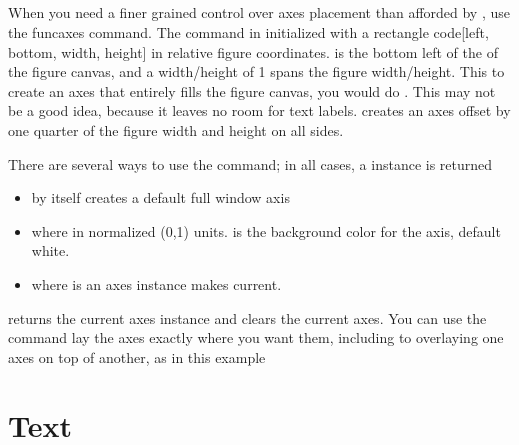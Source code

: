 \documentclass[twoside]{book}
\begin{document}
\subsection{}
\label{sec:axes}

When you need a finer grained control over axes placement than
afforded by , use the func{axes} command.  The
 command in initialized with a rectangle code{[left,
  bottom, width, height]} in relative figure coordinates.   is the bottom left of the of the figure canvas, and
a width/height of 1 spans the figure width/height.  This to create an
axes that entirely fills the figure canvas, you would do .  This may not be a good idea, because it leaves no room
for text labels.   creates an axes
offset by one quarter of the figure width and height on all sides.


There are several ways to use the  command; in all cases, a
 instance is returned

\begin{itemize}
\item {} by itself creates a default full
   window axis
  \item {} where  in normalized (0,1) units.   is the
    background color for the axis, default white.
  \item {} where  is an axes instance makes
   current.
\end{itemize}

\noindent {} returns the current axes instance and 
clears the current axes.  You can use the  command lay the
axes exactly where you want them, including to overlaying one axes on
top of another, as in this example





      
\section{Text}
\label{sec:text}
\end{document}
